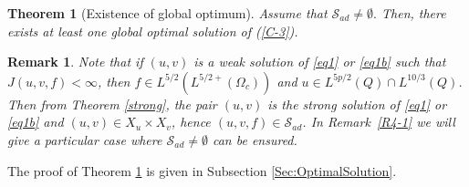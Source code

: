 \documentclass[11pt,reqno]{amsart}%
\newtheorem{theorem}{Theorem}[section]
\newtheorem{remark}{Remark}[section]
\numberwithin{equation}{section}
\begin{document}
\begin{theorem}[Existence of global optimum] \label{control}
Assume that 
$\mathcal{S}_{ad}\ne\emptyset.$ Then, there exists at least one global optimal solution of (\ref{C-3}).
\end{theorem}
\begin{remark}
Note that if $(u,v)$ is a weak solution of \eqref{eq1} or \eqref{eq1b} such that $J(u,v,f)<\infty$, then $f\in L^{5/2}(L^{5/2+}(\Omega_c)) $ and $u\in L^{5p/2}(Q)\cap L^{10/3}(Q)$. Then from Theorem \ref{strong}, the pair $(u,v)$ is the strong solution of  \eqref{eq1} or \eqref{eq1b} and $(u,v)\in X_u\times X_v$, hence
$
(u,v,f)\in \mathcal{S}_{ad}%
$. 
In Remark~\ref{R4-1} we will give a particular case where  $\mathcal{S}_{ad}\ne\emptyset$ can be  ensured.
\end{remark}
The proof of Theorem \ref{control} is given in Subsection \ref{Sec:OptimalSolution}.
%

\

\end{document}

